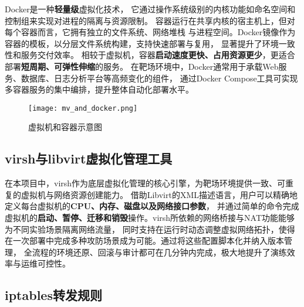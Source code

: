 \documentclass[lang=cn,10pt]{elegantbook}
\begin{document}
Docker是一种\textbf{轻量级}虚拟化技术，
它通过操作系统级别的内核功能如命名空间和控制组来实现对进程的隔离与资源限制。
容器运行在共享内核的宿主机上，但对每个容器而言，它拥有独立的文件系统、网络堆栈
与进程空间。Docker镜像作为容器的模板，以分层文件系统构建，支持快速部署与复用，
显著提升了环境一致性和服务交付效率。
相较于虚拟机，容器\textbf{启动速度更快、占用资源更少}，更适合部署\textbf{短周期、可弹性伸缩}的服务。
在靶场环境中，Docker通常用于承载Web服务、数据库、日志分析平台等高频变化的组件，
通过Docker Compose工具可实现多容器服务的集中编排，提升整体自动化部署水平。

\begin{figure}[!h]
\centering
\texttt{[image: mv\_and\_docker.png]}  %
\caption{虚拟机和容器示意图}  %
\label{fig:vm_and_docker}  %
\end{figure}

\subsection{virsh与libvirt虚拟化管理工具}
在本项目中，virsh作为底层虚拟化管理的核心引擎，为靶场环境提供一致、可重复的虚拟机与网络资源创建能力。
借助Libvirt的XML描述语言，用户可以精确地定义每台虚拟机的\textbf{CPU、内存、磁盘以及网络接口参数}，
并通过简单的命令完成虚拟机的\textbf{启动、暂停、迁移和销毁}操作。virsh所依赖的网络桥接与NAT功能能够为不同实验场景隔离网络流量，
同时支持在运行时动态调整虚拟网络拓扑，使得在一次部署中完成多种攻防场景成为可能。通过将这些配置脚本化并纳入版本管理，
全流程的环境还原、回滚与审计都可在几分钟内完成，极大地提升了演练效率与运维可控性。


\subsection{iptables转发规则}
\end{document}
